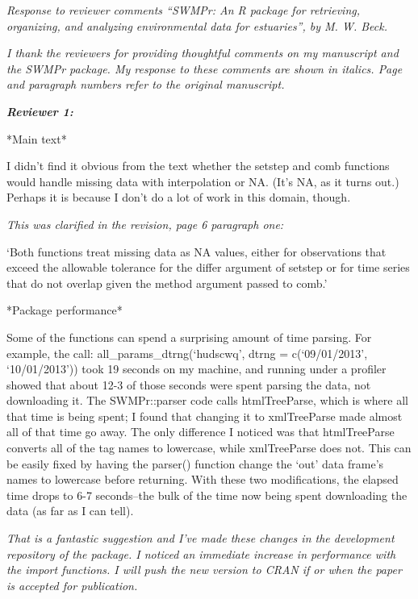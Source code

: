 \documentclass[letterpaper,12pt]{article}\usepackage[]{graphicx}\usepackage[]{color}
\newcommand{\Bigtxt}[1]{\textbf{\textit{#1}}}
\begin{document}
\raggedright


{\it Response to reviewer comments ``SWMPr: An R package for retrieving, organizing, and analyzing environmental data for estuaries'', by M. W. Beck.}

{\it I thank the reviewers for providing thoughtful comments on my manuscript and the SWMPr package.  My response to these comments are shown in italics.  Page and paragraph numbers refer to the original manuscript.}

\Bigtxt{Reviewer 1:}

*Main text*

I didn't find it obvious from the text whether the setstep and comb functions would handle missing data with interpolation or NA. (It's NA, as it turns out.) Perhaps it is because I don't do a lot of work in this domain, though.

{\it This was clarified in the revision, page 6 paragraph one:

`Both functions treat missing data as NA values, either for observations that exceed the allowable tolerance for the differ argument of setstep or for time series that do not overlap given the method argument passed to comb.' 
}

*Package performance*

Some of the functions can spend a surprising amount of time parsing. For example, the call: all\_params\_dtrng(`hudscwq', dtrng = c(`09/01/2013', `10/01/2013')) took 19 seconds on my machine, and running under a profiler showed that about 12-3 of those seconds were spent parsing the data, not downloading it. The SWMPr::parser code calls htmlTreeParse, which is where all that time is being spent; I found that changing it to xmlTreeParse made almost all of that time go away. The only difference I noticed was that htmlTreeParse converts all of the tag names to lowercase, while xmlTreeParse does not. This can be easily fixed by having the parser() function change the `out' data frame's names to lowercase before returning. With these two modifications, the elapsed time drops to 6-7 seconds--the bulk of the time now being spent downloading the data (as far as I can tell).

{\it That is a fantastic suggestion and I've made these changes in the development repository of the package.  I noticed an immediate increase in performance with the import functions.  I will push the new version to CRAN if or when the paper is accepted for publication. 
}
\end{document}
